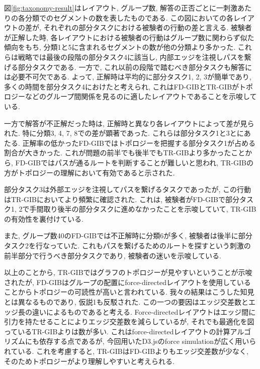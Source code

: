 \documentclass{kuee}
\begin{document}
図\ref{fig:taxonomy-result}はレイアウト, グループ数, 解答の正否ごとに一刺激あたりの各分類でのセグメントの数を表したものである.
この図においての各レイアウトの差が, それぞれの部分タスクにおける被験者の行動の差と言える.
被験者が正解した時, 各レイアウトにおける被験者の行動はグループ数に関わらず似た傾向をもち, 分類1と5に含まれるセグメントの数が他の分類より多かった.
これらは戦略では最後の段階の部分タスク4に該当し, 内部エッジを注視しパスを繋げる部分タスクである.
一方で, これ以前の段階で踏むべき部分タスクも解答には必要不可欠である.
よって, 正解時は平均的に部分タスク1, 2, 3が簡単であり, 多くの時間を部分タスク4におけたと考えられ, これはFD-GIBとTR-GIBがトポロジーなどのグループ間関係を見るのに適したレイアウトであることを示唆している.

一方で解答が不正解だった時は, 正解時と異なり各レイアウトによって差が見られた.
特に分類3, 4, 7, 8での差が顕著であった.
これらは部分タスク1と3とにあたる.
正解率の低かったFD-GIBではトポロジーを把握する部分タスク1が占める割合が大きかった.
これが問題の前半でも後半でもTR-GIBより多かったことから, FD-GIBではパスが通るルートを判断することが難しいと思われ, TR-GIBの方がトポロジーの理解において有効であると示された.

部分タスク3は外部エッジを注視してパスを繋げるタスクであったが, この行動はTR-GIBにおいてより頻繁に確認された.
これは, 被験者がFD-GIBで部分タスク1, 2で手間取り後半の部分タスクに進めなかったことを示唆していて, TR-GIBの有効性を裏付けている.

また, グループ数40のFD-GIBでは不正解時に分類6が多く, 被験者は後半に部分タスク2を行なっていた.
これもパスを繋げるためのルートを探すという刺激の前半部分で行うべき部分タスクであり, 被験者の迷いを示唆している.


以上のことから, TR-GIBではグラフのトポロジーが見やすいということが示唆されたが, FD-GIBはグループの配置にforce-directedレイアウトを使用していることからトポロジーの可読性が高いと言われている\cite{Kobourov2013ForceDirectedDA}.
我々の結果はこうした知見とは異なるものであり, 仮説1も反駁された.
この一つの要因はエッジ交差数とエッジ長の違いによるものであると考える.
Force-directedレイアウトはエッジ間に引力を持たせることによりエッジ交差数を減らしているが, それでも最適化を図っているTR-GIBよりは数が多い.
これはforce-directedレイアウトの計算アルゴリズムにも依存する点であるが, 今回用いたD3.jsのforce simulation\cite{Bostock:2011:DDD:2068462.2068631}が広く用いられている.
これを考慮すると, TR-GIBはFD-GIBよりもエッジ交差数が少なく, そのためトポロジーがより理解しやすいと考えられる.
\end{document}
